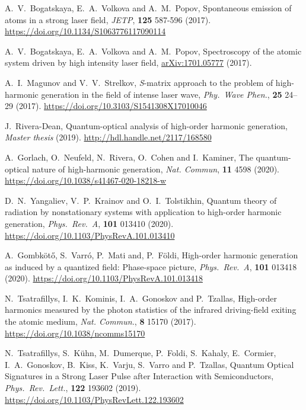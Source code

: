 \begin{thebibliography}{}
    A.\ V.\ Bogatskaya, E.\ A.\ Volkova and A.\ M.\ Popov, Spontaneous emission of atoms in a strong laser field, \emph{JETP}, \textbf{125} 587-596 (2017). \url{https://doi.org/10.1134/S1063776117090114}

    A.\ V.\ Bogatskaya, E.\ A.\ Volkova and A.\ M.\ Popov, Spectroscopy of the atomic system driven by high intensity laser field, \href{https://arxiv.org/abs/1701.05777}{arXiv:1701.05777} (2017).
    
    A.\ I.\ Magunov and V.\ V.\ Strelkov, {\it S}-matrix approach to the problem of high-harmonic generation in the field of intense laser wave, \emph{Phy.\ Wave Phen.}, \textbf{25} 24--29 (2017). \url{https://doi.org/10.3103/S1541308X17010046}

    J.\ Rivera-Dean, Quantum-optical analysis of high-order harmonic generation, \emph{Master thesis} (2019). \url{http://hdl.handle.net/2117/168580}
    
    A.\ Gorlach, O.\ Neufeld, N.\ Rivera, O.\ Cohen and I.\ Kaminer, The quantum-optical nature of high-harmonic generation, \emph{Nat. Commun}, \textbf{11} 4598 (2020). \url{https://doi.org/10.1038/s41467-020-18218-w}

    D.\ N.\ Yangaliev, V.\ P.\ Krainov and O.\ I.\ Tolstikhin, Quantum theory of radiation by nonstationary systems with application to high-order harmonic generation, \emph{Phys.\ Rev.\ A}, \textbf{101} 013410 (2020). \url{https://doi.org/10.1103/PhysRevA.101.013410}
    
    A.\ Gombk\"ot\H{o}, S.\ Varr\'o, P.\ Mati and, P.\ F\"oldi, High-order harmonic generation as induced by a quantized field: Phase-space picture, \emph{Phys.\ Rev.\ A}, \textbf{101} 013418 (2020). \url{https://doi.org/10.1103/PhysRevA.101.013418}

    N.\ Tsatrafillys, I.\ K.\ Kominis, I.\ A.\ Gonoskov and P.\ Tzallas, High-order harmonics measured by the photon statistics of the infrared driving-field exiting the atomic medium, \emph{Nat. Commun.}, \textbf{8} 15170 (2017). \url{https://doi.org/10.1038/ncomms15170}

    N.\ Tsatrafillys, S.\ K\"uhn, M.\ Dumerque, P.\ Foldi, S.\ Kahaly, E.\ Cormier, I.\ A.\ Gonoskov, B.\ Kiss, K.\ Varju, S.\ Varro and P.\ Tzallas, Quantum Optical Signatures in a Strong Laser Pulse after Interaction with Semiconductors, \emph{Phys.\ Rev.\ Lett.}, \textbf{122} 193602 (2019). \url{https://doi.org/10.1103/PhysRevLett.122.193602}


\end{thebibliography}
